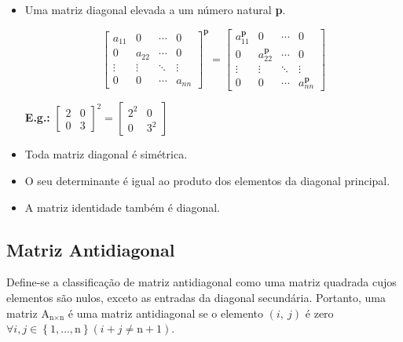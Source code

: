 \documentclass[a4paper,12pt]{article}
\begin{document}
\begin{itemize}
    \item Uma matriz diagonal elevada a um número natural \textbf{p}.
    
    $$ \begin{bmatrix}
 a_{11} & 0 &  \cdots & 0 \\
 0 & a_{22} &  \cdots & 0 \\
 \vdots & \vdots & \ddots & \vdots  \\ 
0 & 0  & \cdots & a_{nn}
 \end{bmatrix} ^{\textbf{p}} = \begin{bmatrix}
 a_{11}^{\textbf{p}} & 0 &  \cdots & 0 \\
 0 & a_{22}^{\textbf{p}} &  \cdots & 0 \\
 \vdots & \vdots & \ddots & \vdots  \\ 
0 & 0  & \cdots & a_{nn}^{\textbf{p}}
 \end{bmatrix} $$
    
    \textbf{E.g.:} $ \begin{bmatrix}
    2 & 0\\
    0 & 3
    \end{bmatrix}^{2} = \begin{bmatrix}
    2^{2} & 0 \\
    0 & 3^{2}
    \end{bmatrix} $

    \item Toda matriz diagonal é simétrica.
    
    \item O seu determinante é igual ao produto dos elementos da diagonal principal.
    
    \item A matriz identidade também é diagonal.

\end{itemize}

\subsection{Matriz Antidiagonal}

Define-se a classificação de matriz antidiagonal como uma matriz quadrada cujos elementos são nulos, exceto as entradas da diagonal secundária. Portanto, uma matriz $ \text{A}_{\text{n} \times \text{n}} $ é uma matriz antidiagonal se o elemento $ (i, \ j) $ é zero $ \forall i,j  \in \left\{1, \ldots, \text{n}\right\} (i+j \ne \text{n}+1) $.
\end{document}

